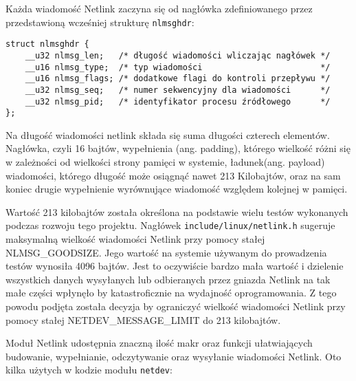 \documentclass[10pt]{article}
\begin{document}
Każda wiadomość Netlink zaczyna się od nagłówka zdefiniowanego przez przedstawioną wcześniej strukturę \texttt{nlmsghdr}:

\begin{verbatim}
struct nlmsghdr {
    __u32 nlmsg_len;   /* długość wiadomości wliczając nagłówek */
    __u16 nlmsg_type;  /* typ wiadomości                        */
    __u16 nlmsg_flags; /* dodatkowe flagi do kontroli przepływu */
    __u32 nlmsg_seq;   /* numer sekwencyjny dla wiadomości      */
    __u32 nlmsg_pid;   /* identyfikator procesu źródłowego      */
};
\end{verbatim}

Na długość wiadomości netlink składa się suma długości czterech elementów. Nagłówka, czyli 16 bajtów, wypełnienia (ang. padding), którego wielkość różni się w zależności od wielkości strony pamięci w systemie, ładunek(ang. payload) wiadomości, którego długość może osiągnąć nawet 213 Kilobajtów, oraz na sam koniec drugie wypełnienie wyrównujące wiadomość względem kolejnej w pamięci.

Wartość 213 kilobajtów została określona na podstawie wielu testów wykonanych podczas rozwoju tego projektu. Nagłówek \texttt{include/linux/netlink.h} sugeruje maksymalną wielkość wiadomości Netlink przy pomocy stałej NLMSG\_GOODSIZE. Jego wartość na systemie używanym do prowadzenia testów wynosiła 4096 bajtów. Jest to oczywiście bardzo mała wartość i dzielenie wszystkich danych wysyłanych lub odbieranych przez gniazda Netlink na tak małe części wpłynęło by katastroficznie na wydajność oprogramowania. Z tego powodu podjęta została decyzja by ograniczyć wielkość wiadomości Netlink przy pomocy stałej NETDEV\_MESSAGE\_LIMIT do 213 kilobajtów.

Moduł Netlink udostępnia znaczną ilość makr oraz funkcji ułatwiających budowanie, wypełnianie, odczytywanie oraz wysyłanie wiadomości Netlink.  Oto kilka użytych w kodzie modułu \texttt{netdev}:
\end{document}
